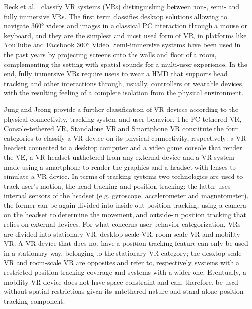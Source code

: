 Beck et al.~\cite{beck_2019_virtual} classify VR systems (VRs) distinguishing between non-, semi- and fully immersive VRs. The first term classifies desktop solutions allowing to navigate 360° videos and images in a classical PC interaction through a mouse or keyboard, and they are the simplest and most used form of VR, in platforms like YouTube and Facebook 360° Video. Semi-immersive systems have been used in the past years by projecting screens onto the walls and floor of a room, complementing the setting with spatial sounds for a multi-user experience.
In the end, fully immersive VRs require users to wear a HMD that supports head tracking and other interactions through, usually, controllers or wearable devices, with the resulting feeling of a complete isolation from the physical environment.

Jung and Jeong \cite{jung_classification_2020} provide a further classification of VR devices according to the physical connectivity, tracking system and user behavior. The PC-tethered VR, Console-tethered VR, Standalone VR and Smartphone VR constitute the four categories to classify a VR device on its physical connectivity, respectively: a VR headset connected to a desktop computer and a video game console that render the VE, a VR headset unthetered from any external device and a VR system made using a smartphone to render the graphics and a headset with lenses to simulate a VR device. In terms of tracking systems two technologies are used to track user's motion, the head tracking and position tracking: the latter uses internal sensors of the headset (e.g. gyroscope, accelerometer and magnetometer), the former can be again divided into inside-out position tracking, using a camera on the headset to determine the movement, and outside-in position tracking that relies on external devices.
For what concerns user behavior categorization, VRs are divided into stationary VR, desktop-scale VR, room-scale VR and mobility VR. A VR device that does not have a position tracking feature can only be used in a stationary way, belonging to the stationary VR category; the desktop-scale VR and room-scale VR are opposites and refer to, respectively, systems with a restricted position tracking coverage and systems with a wider one. Eventually, a mobility VR device does not have space constraint and can, therefore, be used without spatial restrictions given its untethered nature and stand-alone position tracking component.